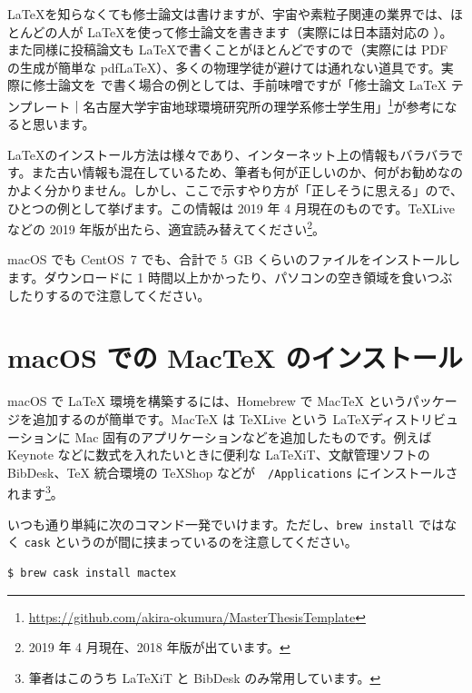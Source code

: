\LaTeX を知らなくても修士論文は書けますが、宇宙や素粒子関連の業界では、ほとんどの人が \LaTeX を使って修士論文を書きます（実際には日本語対応の \pLaTeX）。また同様に投稿論文も \LaTeX で書くことがほとんどですので（実際には PDF の生成が簡単な pdf\LaTeX）、多くの物理学徒が避けては通れない道具です。実際に修士論文を \pLaTeX で書く場合の例としては、手前味噌ですが「修士論文 LaTeX テンプレート｜名古屋大学宇宙地球環境研究所の理学系修士学生用」\footnote{\url{https://github.com/akira-okumura/MasterThesisTemplate}}が参考になると思います。

\LaTeX のインストール方法は様々であり、インターネット上の情報もバラバラです。また古い情報も混在しているため、筆者も何が正しいのか、何がお勧めなのかよく分かりません。しかし、ここで示すやり方が「正しそうに思える」ので、ひとつの例として挙げます。この情報は 2019 年 4 月現在のものです。TeXLive などの 2019 年版が出たら、適宜読み替えてください\footnote{2019 年 4 月現在、2018 年版が出ています。}。

macOS でも CentOS~7 でも、合計で 5~GB くらいのファイルをインストールします。ダウンロードに 1 時間以上かかったり、パソコンの空き領域を食いつぶしたりするので注意してください。

\section{macOS での MacTeX のインストール}

macOS で LaTeX 環境を構築するには、Homebrew で MacTeX というパッケージを追加するのが簡単です。MacTeX は TeXLive という \LaTeX ディストリビューションに Mac 固有のアプリケーションなどを追加したものです。例えば Keynote などに数式を入れたいときに便利な LaTeXiT、文献管理ソフトの BibDesk、TeX 統合環境の TeXShop などが　\texttt{/Applications} にインストールされます\footnote{筆者はこのうち LaTeXiT と BibDesk のみ常用しています。}。

いつも通り単純に次のコマンド一発でいけます。ただし、\texttt{brew install} ではなく \texttt{cask} というのが間に挟まっているのを注意してください。
\begin{lstlisting}[language=bash]
$ brew cask install mactex
\end{lstlisting}

